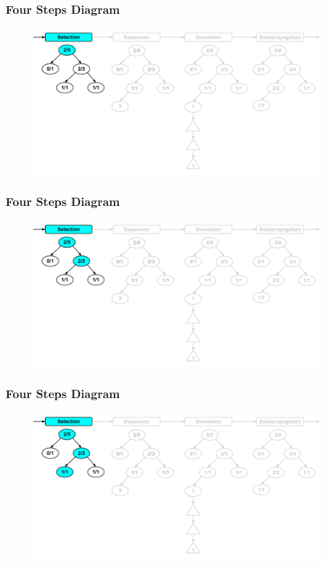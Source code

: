 \documentclass{beamer}
\begin{document}
\begin{frame}[fragile]
\frametitle{Four Steps Diagram}
\begin{figure}[h]
	\includegraphics[width=11cm]{Diagrams/FourSteps/MCTSFourStepProcessOneOne.pdf}
	\centering
\end{figure}
\end{frame}

\begin{frame}[fragile]
\frametitle{Four Steps Diagram}
\begin{figure}[h]
	\includegraphics[width=11cm]{Diagrams/FourSteps/MCTSFourStepProcessOneTwo.pdf}
	\centering
\end{figure}
\end{frame}

\begin{frame}[fragile]
\frametitle{Four Steps Diagram}
\begin{figure}[h]
	\includegraphics[width=11cm]{Diagrams/FourSteps/MCTSFourStepProcessOneThree.pdf}
	\centering
\end{figure}
\end{frame}
\end{document}
